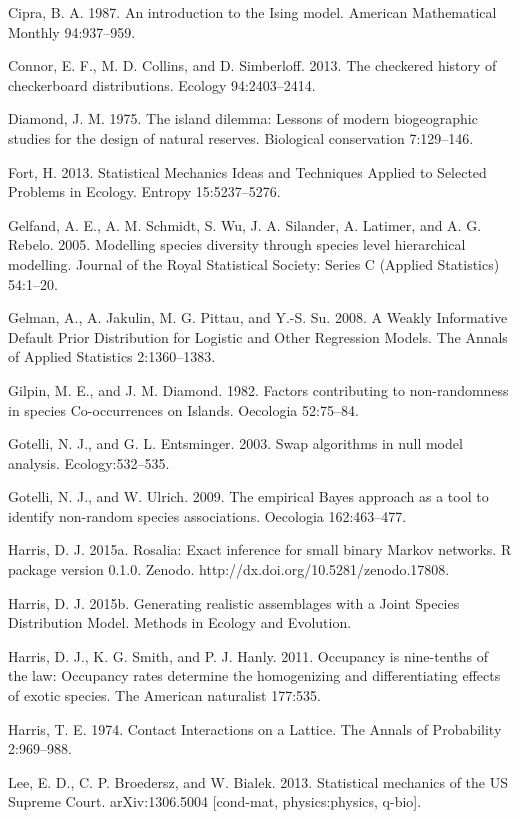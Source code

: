 \documentclass[12pt,]{article}
\begin{document}
\begin{spacing}{1.9}
\begin{flushleft}
Cipra, B. A. 1987. An introduction to the Ising model. American
Mathematical Monthly 94:937--959.

Connor, E. F., M. D. Collins, and D. Simberloff. 2013. The checkered
history of checkerboard distributions. Ecology 94:2403--2414.

Diamond, J. M. 1975. The island dilemma: Lessons of modern biogeographic
studies for the design of natural reserves. Biological conservation
7:129--146.

Fort, H. 2013. Statistical Mechanics Ideas and Techniques Applied to
Selected Problems in Ecology. Entropy 15:5237--5276.

Gelfand, A. E., A. M. Schmidt, S. Wu, J. A. Silander, A. Latimer, and A.
G. Rebelo. 2005. Modelling species diversity through species level
hierarchical modelling. Journal of the Royal Statistical Society: Series
C (Applied Statistics) 54:1--20.

Gelman, A., A. Jakulin, M. G. Pittau, and Y.-S. Su. 2008. A Weakly
Informative Default Prior Distribution for Logistic and Other Regression
Models. The Annals of Applied Statistics 2:1360--1383.

Gilpin, M. E., and J. M. Diamond. 1982. Factors contributing to
non-randomness in species Co-occurrences on Islands. Oecologia
52:75--84.

Gotelli, N. J., and G. L. Entsminger. 2003. Swap algorithms in null
model analysis. Ecology:532--535.

Gotelli, N. J., and W. Ulrich. 2009. The empirical Bayes approach as a
tool to identify non-random species associations. Oecologia
162:463--477.

Harris, D. J. 2015a. Rosalia: Exact inference for small binary Markov
networks. R package version 0.1.0. Zenodo.
http://dx.doi.org/10.5281/zenodo.17808.

Harris, D. J. 2015b. Generating realistic assemblages with a Joint
Species Distribution Model. Methods in Ecology and Evolution.

Harris, D. J., K. G. Smith, and P. J. Hanly. 2011. Occupancy is
nine-tenths of the law: Occupancy rates determine the homogenizing and
differentiating effects of exotic species. The American naturalist
177:535.

Harris, T. E. 1974. Contact Interactions on a Lattice. The Annals of
Probability 2:969--988.

Lee, E. D., C. P. Broedersz, and W. Bialek. 2013. Statistical mechanics
of the US Supreme Court. arXiv:1306.5004 {[}cond-mat, physics:physics,
q-bio{]}.


\end{flushleft}
\end{spacing}
\end{document}
